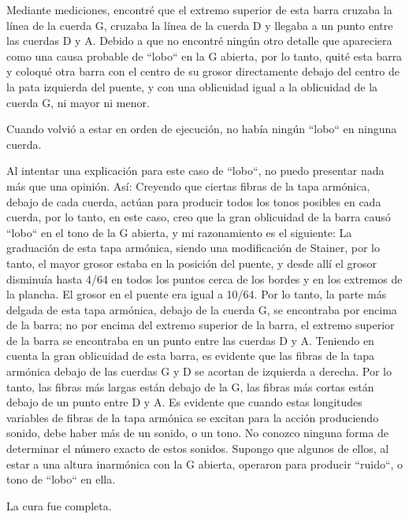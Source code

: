 \documentclass[12pt]{book}
\begin{document}
Mediante mediciones, encontré que el extremo superior de esta barra cruzaba la línea de la cuerda G, cruzaba la línea de la cuerda D y llegaba a un punto entre las cuerdas D y A. Debido a que no encontré ningún otro detalle que apareciera como una causa probable de ``lobo`` en la G abierta, por lo tanto, quité esta barra y coloqué otra barra con el centro de su grosor directamente debajo del centro de la pata izquierda del puente, y con una oblicuidad igual a la oblicuidad de la cuerda G, ni mayor ni menor.

Cuando volvió a estar en orden de ejecución, no había ningún ``lobo`` en ninguna cuerda.

Al intentar una explicación para este caso de ``lobo``, no puedo presentar nada más que una opinión. Así: Creyendo que ciertas fibras de la tapa armónica, debajo de cada cuerda, actúan para producir todos los tonos posibles en cada cuerda, por lo tanto, en este caso, creo que la gran oblicuidad de la barra causó ``lobo`` en el tono de la G abierta, y mi razonamiento es el siguiente: La graduación de esta tapa armónica, siendo una modificación de Stainer, por lo tanto, el mayor grosor estaba en la posición del puente, y desde allí el grosor disminuía hasta 4/64 en todos los puntos cerca de los bordes y en los extremos de la plancha. El grosor en el puente era igual a 10/64. Por lo tanto, la parte más delgada de esta tapa armónica, debajo de la cuerda G, se encontraba por encima de la barra; no por encima del extremo superior de la barra, el extremo superior de la barra se encontraba en un punto entre las cuerdas D y A. Teniendo en cuenta la gran oblicuidad de esta barra, es evidente que las fibras de la tapa armónica debajo de las cuerdas G y D se acortan de izquierda a derecha. Por lo tanto, las fibras más largas están debajo de la G, las fibras más cortas están debajo de un punto entre D y A. Es evidente que cuando estas longitudes variables de fibras de la tapa armónica se excitan para la acción produciendo sonido, debe haber más de un sonido, o un tono. No conozco ninguna forma de determinar el número exacto de estos sonidos. Supongo que algunos de ellos, al estar a una altura inarmónica con la G abierta, operaron para producir ``ruido``, o tono de ``lobo`` en ella.

La cura fue completa.
\end{document}
